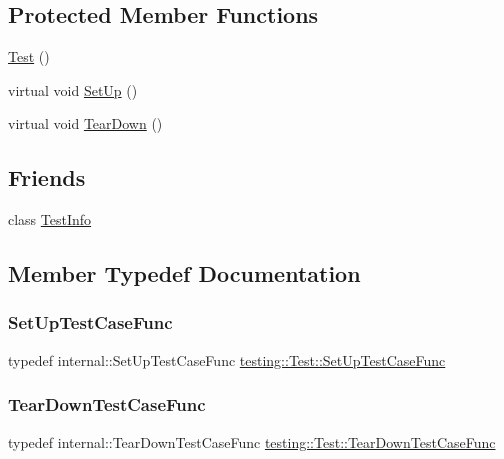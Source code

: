 \subsection*{Protected Member Functions}
\begin{DoxyCompactItemize}
\item 
\mbox{\hyperlink{classtesting_1_1_test_a68b7618abd1fc6d13382738b0d3b5c7c}{Test}} ()
\item 
virtual void \mbox{\hyperlink{classtesting_1_1_test_a8b38992669fb844864807cf32e416853}{Set\+Up}} ()
\item 
virtual void \mbox{\hyperlink{classtesting_1_1_test_aab3c02c9f81afe1357adfc45afccd474}{Tear\+Down}} ()
\end{DoxyCompactItemize}
\subsection*{Friends}
\begin{DoxyCompactItemize}
\item 
class \mbox{\hyperlink{classtesting_1_1_test_a4c49c2cdb6c328e6b709b4542f23de3c}{Test\+Info}}
\end{DoxyCompactItemize}


\subsection{Member Typedef Documentation}
\mbox{\label{classtesting_1_1_test_a5f2a051d1d99c9b784c666c586186cf9}} 
\subsubsection{\texorpdfstring{SetUpTestCaseFunc}{SetUpTestCaseFunc}}
{\footnotesize\ttfamily typedef internal\+::\+Set\+Up\+Test\+Case\+Func \mbox{\hyperlink{classtesting_1_1_test_a5f2a051d1d99c9b784c666c586186cf9}{testing\+::\+Test\+::\+Set\+Up\+Test\+Case\+Func}}}

\mbox{\label{classtesting_1_1_test_aa0f532e93b9f3500144c53f31466976c}} 
\subsubsection{\texorpdfstring{TearDownTestCaseFunc}{TearDownTestCaseFunc}}
{\footnotesize\ttfamily typedef internal\+::\+Tear\+Down\+Test\+Case\+Func \mbox{\hyperlink{classtesting_1_1_test_aa0f532e93b9f3500144c53f31466976c}{testing\+::\+Test\+::\+Tear\+Down\+Test\+Case\+Func}}}




